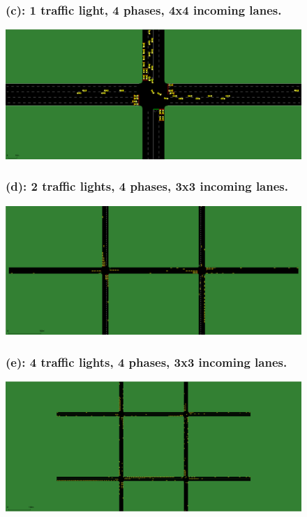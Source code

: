 \pagebreak


\begin{figure}[h]
\subsubsection*{(c): 1 traffic light, 4 phases, 4x4 incoming lanes.}
\includegraphics[width=\textwidth]{img/Appendix/scenario_c.png}
\centering
\end{figure}

\begin{figure}[h]
\subsubsection*{(d): 2 traffic lights, 4 phases, 3x3 incoming lanes.}
\includegraphics[width=\textwidth]{img/Appendix/scenario_d.png}
\centering
\end{figure}

\begin{figure}[h!]
\subsubsection*{(e): 4 traffic lights, 4 phases, 3x3 incoming lanes.}
\includegraphics[width=\textwidth]{img/Appendix/scenario_e.png}
\centering
\end{figure}

